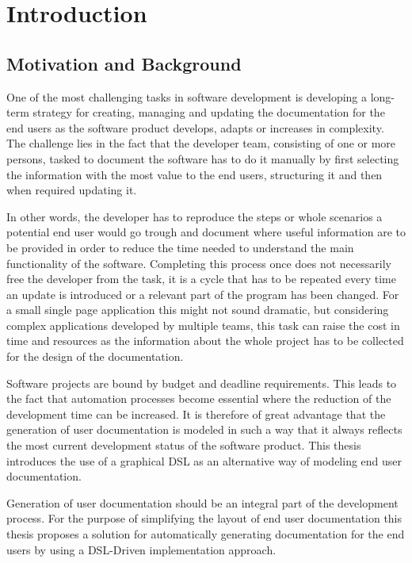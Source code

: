 \chapter{Introduction}
\section{Motivation and Background}
One of the most challenging tasks in software development is developing a long-term strategy for creating, managing and updating the documentation for the end users as the software product develops, adapts or increases in complexity. The challenge lies in the fact that the developer team, consisting of one or more persons, tasked to document the software has to do it manually by first selecting the information with the most value to the end users, structuring it and then when required updating it.

In other words, the developer has to reproduce the steps or whole scenarios a potential end user would go trough and document where useful information are to be provided in order to reduce the time needed to understand the main functionality of the software. Completing this process once does not necessarily free the developer from the task, it is a cycle that has to be repeated every time an update is introduced or a relevant part of the program has been changed. For a small single page application this might not sound dramatic, but considering complex applications developed by multiple teams, this task can raise the cost in time and resources as the information about the whole project has to be collected for the design of the documentation\cite{5712775}.

Software projects are bound by budget and deadline requirements. This leads to the fact that automation processes become essential where the reduction of the development time can be increased. It is therefore of great advantage that the generation of user documentation is modeled in such a way that it always reflects the most current development status of the software product. This thesis introduces the use of a graphical \gls{DSL} as an alternative way of modeling end user documentation.

Generation of user documentation should be an integral part of the development process. For the purpose of simplifying the layout of end user documentation this thesis proposes a solution for automatically generating documentation for the end users by using a DSL-Driven implementation approach.

